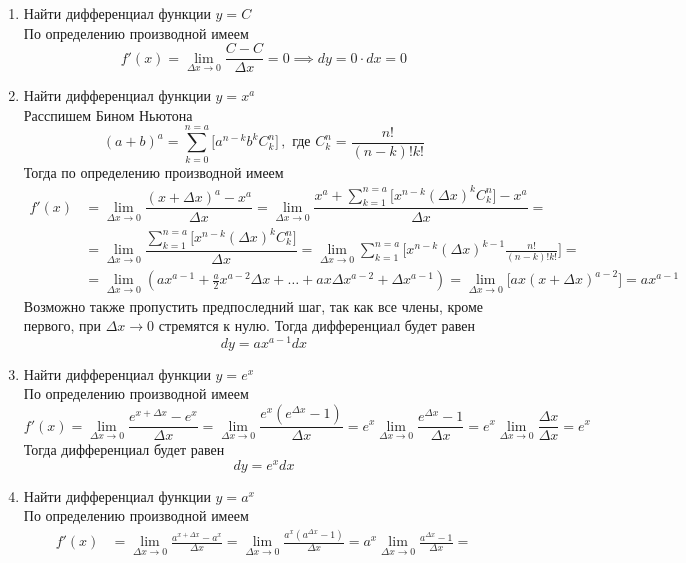 \documentclass[12pt]{article}
\begin{document}
\begin{enumerate}
	\item {\hywenhei Найти дифференциал функции $y = C$} \\
	По определению производной имеем
	\[
		f'(x) = \lim_{\Delta x \to 0}\frac{C - C}{\Delta x} = 0 \implies dy = 0 \cdot dx = 0
	\]
	\item {\hywenhei Найти дифференциал функции $y = x^a$} \\
	Расспишем Бином Ньютона
	\[
		\displaystyle (a + b)^a = \sum_{k = 0}^{n = a}\Big[ a^{n-k} b^k C_k^n \Big]\,,\text{ где } C_k^n = \dfrac{n!}{(n-k)!k!}
	\]
	Тогда по определению производной имеем
	\[
		\begin{aligned}
			\displaystyle f'(x) &= \lim_{\Delta x \to 0}\dfrac{(x + \Delta x)^a - x^a}{\Delta x} = \lim_{\Delta x \to 0}\dfrac{\displaystyle x^a + \sum_{k = 1}^{n = a} \Big[ x^{n-k} (\Delta x)^k C_k^n \Big] - x^a}{\Delta x} = \\
								&= \lim_{\Delta x \to 0}\dfrac{\displaystyle \sum_{k = 1}^{n = a} \Big[ x^{n-k} (\Delta x)^k C_k^n \Big]}{\Delta x} = \lim_{\Delta x \to 0}\sum_{k = 1}^{n = a} \Big[ x^{n-k} (\Delta x)^{k-1} \frac{n!}{(n-k)!k!} \Big] = \\
								&= \lim_{\Delta x \to 0}\left(ax^{a-1}+\frac{a}{2}x^{a-2}\Delta x+\dots+ax\Delta x^{a-2}+\Delta x^{a-1}\right)=\lim_{\Delta x \to 0}\Big[ax(x+\Delta x)^{a-2}\Big]=ax^{a-1}
		\end{aligned}
	\]
	Возможно также пропустить предпоследний шаг, так как все члены, кроме первого, при $\Delta x \to 0$ стремятся к нулю. Тогда дифференциал будет равен
	\[
		dy = ax^{a-1}dx
	\]
	\item {\hywenhei Найти дифференциал функции $y = e^x$} \\
	По определению производной имеем
	\[
		f'(x) = \lim_{\Delta x \to 0}\frac{e^{x + \Delta x} - e^x}{\Delta x} = \lim_{\Delta x \to 0}\frac{e^x(e^{\Delta x} - 1)}{\Delta x} = e^x \lim_{\Delta x \to 0}\frac{e^{\Delta x} - 1}{\Delta x} = e^x \lim_{\Delta x \to 0}\frac{\Delta x}{\Delta x} = e^x
	\]
	Тогда дифференциал будет равен
	\[
		dy = e^x dx
	\]
\item {\hywenhei Найти дифференциал функции $y = a^x$} \\
	По определению производной имеем
	\[
		\begin{aligned}
			f'(x) &= \lim_{\Delta x \to 0}\frac{a^{x + \Delta x} - a^x}{\Delta x} = \lim_{\Delta x \to 0}\frac{a^x(a^{\Delta x} - 1)}{\Delta x} = a^x \lim_{\Delta x \to 0}\frac{a^{\Delta x} - 1}{\Delta x} = \\

\end{aligned}\]
\end{enumerate}
\end{document}
